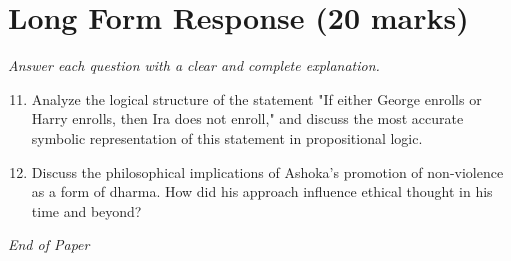 \documentclass[12pt]{article}
\begin{document}
\section*{Long Form Response (20 marks)}
\textit{Answer each question with a clear and complete explanation.}
\begin{enumerate}[label=\arabic*.]
\setcounter{enumi}{10}
\item Analyze the logical structure of the statement "If either George enrolls or Harry enrolls, then Ira does not enroll," and discuss the most accurate symbolic representation of this statement in propositional logic.
\item Discuss the philosophical implications of Ashoka's promotion of non-violence as a form of dharma. How did his approach influence ethical thought in his time and beyond?
\end{enumerate}

\vfill
\noindent\textit{End of Paper}
\end{document}
